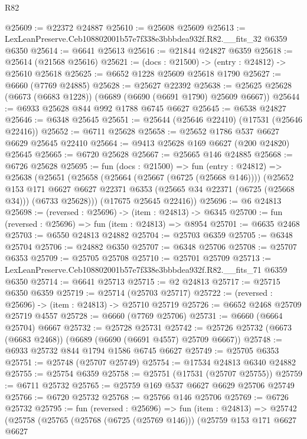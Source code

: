 \begin{lexlean}{R82}
\begin{coremodule}
@25609 := @22372 @24887
@25610 := @25608 @25609
@25613 := LexLeanPreserve.Ceb108802001b57e7f338e3bbbdea932f.R82.__fits_32 @6359 @6350
@25614 := @6641 @25613
@25616 := @21844 @24827 @6359
@25618 := @25614 (@21568 @25616)
@25621 := (docs : @21500) -> (entry : @24812) -> @25610 @25618
@25625 := @6652 @1228 @25609 @25618 @1790
@25627 := @6660 (@7769 @24885)
@25628 := @25627 @22392
@25638 := @25625 @25628 (@6673 (@6683 @1228)) (@6689 (@6690 (@6691 @1790) @25609 @6667))
@25644 := @6933 @25628 @844 @992 @1788 @6745 @6627
@25645 := @6538 @24827
@25646 := @6348 @25645
@25651 := @25644 (@25646 @22410) (@17531 (@25646 @22416))
@25652 := @6711 @25628
@25658 := @25652 @1786 @537 @6627 @6629 @25645 @22410
@25664 := @9413 @25628 @169 @6627 (@200 @24820) @25645
@25665 := @6720 @25628
@25667 := @25665 @146 @24885
@25668 := @6726 @25628
@25695 := fun (docs : @21500) =>
  fun (entry : @24812) =>
  @25638
    (@25651
      (@25658
        (@25664 (@25667 (@6725 (@25668 @146))))
        (@25652
          @153
          @171
          @6627
          @6627
          @22371
          @6353
          (@25665 @34 @22371 (@6725 (@25668 @34)))
          (@6733 @25628)))
      (@17675 @25645 @22416))
@25696 := @6 @24813
@25698 := (reversed : @25696) -> (item : @24813) -> @6345
@25700 := fun (reversed : @25696) => fun (item : @24813) => @8954
@25701 := @6635 @2468
@25703 := @6550 @24813 @24882
@25704 := @25703 @6359
@25705 := @6348 @25704
@25706 := @24882 @6350
@25707 := @6348 @25706
@25708 := @25707 @6353
@25709 := @25705 @25708
@25710 := @25701 @25709
@25713 := LexLeanPreserve.Ceb108802001b57e7f338e3bbbdea932f.R82.__fits_71 @6359 @6350
@25714 := @6641 @25713
@25715 := @2 @24813
@25717 := @25715 @6350 @6359
@25719 := @25714 (@25703 @25717)
@25722 := (reversed : @25696) -> (item : @24813) -> @25710 @25719
@25726 := @6652 @2468 @25709 @25719 @4557
@25728 := @6660 (@7769 @25706)
@25731 := @6660 (@6664 @25704) @6667
@25732 := @25728 @25731
@25742 := @25726 @25732 (@6673 (@6683 @2468)) (@6689 (@6690 (@6691 @4557) @25709 @6667))
@25748 := @6933 @25732 @844 @1794 @1586 @6745 @6627
@25749 := @25705 @6353
@25751 := @25748 (@25707 @25749)
@25754 := @17534 @24813 @6340 @24882
@25755 := @25754 @6359
@25758 := @25751 (@17531 (@25707 @25755))
@25759 := @6711 @25732
@25765 := @25759 @169 @537 @6627 @6629 @25706 @25749
@25766 := @6720 @25732
@25768 := @25766 @146 @25706
@25769 := @6726 @25732
@25795 := fun (reversed : @25696) =>
  fun (item : @24813) =>
  @25742
    (@25758
      (@25765
        (@25768 (@6725 (@25769 @146)))
        (@25759
          @153
          @171
          @6627
          @6627

\end{coremodule}
\end{lexlean}
